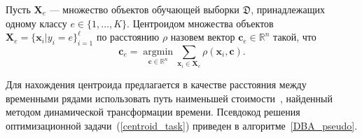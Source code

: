 Пусть $\mathbf{X}_e$ --- множество объектов обучающей выборки $\mathfrak{D}$, принадлежащих одному классу $e \in \{1, \dots, K\}$.
Центроидом множества объектов $\mathbf{X}_e = \{\mathbf{x}_i|y_i=e\}_{i=1}^\ell$ по расстоянию $\rho$ назовем вектор $\mathbf{c}_e \in \mathbb{R}^n$ такой, что
\begin{equation}
\label{centroid_task}
\mathbf{c}_e = \mathop{\text{argmin}}\limits_{{\mathbf{c} \in \mathbb{R}^n}}\sum_{\mathbf{x}_i \in \mathbf{X}_e}
{\rho(\mathbf{x}_i ,\mathbf{c})}.
\end{equation}

Для нахождения центроида предлагается в качестве расстояния между временными рядами использовать путь наименьшей стоимости~\cite{goncharov2015cost}, найденный методом динамической трансформации времени.
Псевдокод решения оптимизационной задачи~(\ref{centroid_task}) приведен в алгоритме~\ref{DBA_pseudo}.

